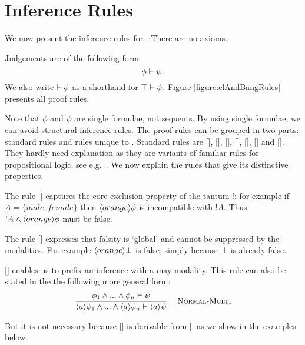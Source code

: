 \section{Inference Rules}\label{elAndBangMore}



\NI We now present the inference rules for \cathoristic{}. There are no
axioms.

\begin{definition} Judgements are of the following form.
\[
  \phi \vdash \psi.
\]
We also write $\vdash \phi$ as a shorthand for $\top \vdash
\phi$. Figure \ref{figure:elAndBangRules}
presents all proof rules.
\end{definition}

\NI Note that $\phi$ and $\psi$ are single formulae, not sequents.  By
using single formulae, we can avoid structural inference rules.  The
proof rules can be grouped in two parts: standard rules and rules
unique to \cathoristic{}.  Standard rules are [],
[], [],
[], [],
[] and []. They hardly need
explanation as they are variants of familiar rules for propositional
logic, see e.g.~\cite{TroelstraAS:basprot,vanDalenD:logstr}.  We now
explain the rules that give \cathoristic{} its distinctive properties.

The rule []  captures the core
exclusion property of the tantum !: for example if $A = \{male, female\}$
then $\langle orange \rangle \phi$ is incompatible with $!A$. Thus $!A \land
\langle orange \rangle \phi$ must be false.

The rule [] expresses that falsity is `global'
  and cannot be suppressed by the modalities. For example
  $\langle orange \rangle \bot$ is false, simply because $\bot$ is already
  false.

[] enables us to prefix an inference with a
may-modality.  This rule can also be stated in the the following more
general form:
\[
   \ONEPREMISERULENAMEDRIGHT
   {
     \phi_1\AND ...\AND \phi_n \judge \psi
   }
   {
     \MAY{a}{\phi_1}\AND ...\AND \MAY{a}{\phi_n} \judge \MAY{a}{\psi}
   }{Normal-Multi}
\]

\NI But it is not necessary because [] is
derivable from [] as we show in the examples below.


